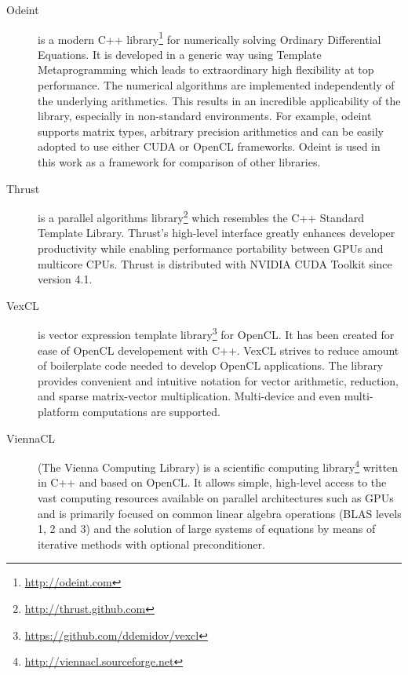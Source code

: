 \documentclass[1p]{elsarticle}
\begin{document}
\begin{description}
    \item[Odeint] is a modern C++
        library\footnote{\href{http://odeint.com}{http://odeint.com}} for
        numerically solving Ordinary Differential Equations. It is developed in
        a generic way using Template Metaprogramming which leads to
        extraordinary high flexibility at top performance. The numerical
        algorithms are implemented independently of the underlying arithmetics.
        This results in an incredible applicability of the library, especially
        in non-standard environments. For example, odeint supports matrix
        types, arbitrary precision arithmetics and can be easily adopted to use
        either CUDA or OpenCL frameworks.  Odeint is used in this work as a
        framework for comparison of other libraries.
    \item[Thrust] is a parallel algorithms
        library\footnote{\href{http://thrust.github.com}{http://thrust.github.com}}
        which resembles the C++ Standard Template Library. Thrust's high-level
        interface greatly enhances developer productivity while enabling
        performance portability between GPUs and multicore CPUs. Thrust is
        distributed with NVIDIA CUDA Toolkit since version 4.1.
    \item[VexCL] is vector expression template
        library\footnote{\href{https://github.com/ddemidov/vexcl}{https://github.com/ddemidov/vexcl}}
        for OpenCL. It has been created for ease of OpenCL developement with
        C++.  VexCL strives to reduce amount of boilerplate code needed to
        develop OpenCL applications. The library provides convenient and
        intuitive notation for vector arithmetic, reduction, and sparse
        matrix-vector multiplication.  Multi-device and even multi-platform
        computations are supported. 
    \item[ViennaCL] (The Vienna Computing Library) is a scientific computing
        library\footnote{\href{http://viennacl.sourceforge.net}{http://viennacl.sourceforge.net}}
        written in C++ and based on OpenCL. It allows simple, high-level access
        to the vast computing resources available on parallel architectures
        such as GPUs and is primarily focused on common linear algebra
        operations (BLAS levels 1, 2 and 3) and the solution of large systems
        of equations by means of iterative methods with optional
        preconditioner.
\end{description}
\end{document}
